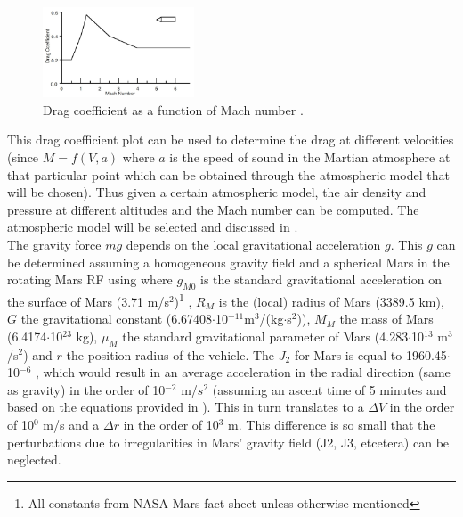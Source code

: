 \begin{figure}[!ht]
\centering
\includegraphics[width=0.4\textwidth]{figures/launcher_methods/dragcoeff_whitehead2004mars.jpg}
\caption{Drag coefficient as a function of Mach number \cite{whitehead2004mars}.}
\label{fig:dragcoeff_whitehead2004mars}
\end{figure} 


This drag coefficient plot can be used to determine the drag at different velocities (since $M=f\left(V,a\right)$ where $a$ is the speed of sound in the Martian atmosphere at that particular point which can be obtained through the atmospheric model that will be chosen). Thus given a certain atmospheric model, the air density and pressure at different altitudes and the Mach number can be computed. The atmospheric model will be selected and discussed in . \\




The gravity force $mg$ depends on the local gravitational acceleration $g$. This $g$ can be determined assuming a homogeneous gravity field and a spherical Mars in the rotating Mars \ac{RF} using  where $g_{M0}$ is the standard gravitational acceleration on the surface of Mars (3.71 m/s$^{2}$)\footnote{All constants from NASA Mars fact sheet \cite{williams2015} unless otherwise mentioned} , $R_{M}$ is the (local) radius of Mars (3389.5 km), $G$ the gravitational constant (6.67408$\cdot$10$^{-11}$m$^{3}$/(kg$\cdot$s$^{2}$)), $M_{M}$ the mass of Mars (6.4174$\cdot$10$^{23}$ kg), $\mu_{M}$ the standard gravitational parameter of Mars (4.283$\cdot$10$^{13}$ m$^{3}$/s$^{2}$) and $r$ the position radius of the vehicle. The $J_{2}$ for Mars is equal to 1960.45$\cdot$ 10$^{-6}$ \cite{williams2015}, which would result in an average acceleration in the radial direction (same as gravity) in the order of 10$^{-2}$ m/$s^{2}$ (assuming an ascent time of 5 minutes and based on the equations provided in \cite{noomen2011kepler}). This in turn translates to a $\Delta V$ in the order of 10$^{0}$ m/s and a $\Delta r$ in the order of 10$^{3}$ m. This difference is so small that the perturbations due to irregularities in Mars' gravity field (J2, J3, etcetera) can be neglected.


